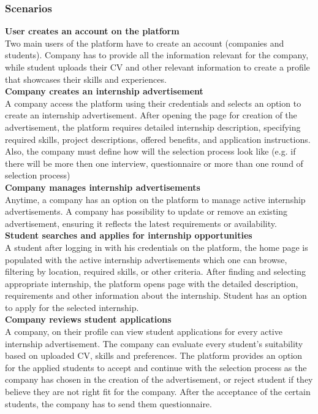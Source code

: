 \subsubsection{Scenarios}

\textbf{User creates an account on the platform}\\ 
Two main users of the platform have to create an account (companies and students). Company has to provide all the information relevant for the company, while student uploads their CV and other relevant information to create a profile that showcases their skills and experiences.\\

\textbf{Company creates an internship advertisement}\\
A company access the platform using their credentials and selects an option to create an internship advertisement. After opening the page for creation of the advertisement, the platform requires detailed internship description, specifying required skills, project descriptions, offered benefits, and application instructions. Also, the company must define how will the selection process look like (e.g. if there will be more then one interview, questionnaire or more than one round of selection process)  \\

\textbf{Company manages internship advertisements}\\
Anytime, a company has an option on the platform to manage active internship advertisements. A company has possibility to update or remove an existing advertisement, ensuring it reflects the latest requirements or availability.\\

\textbf{Student searches and applies for internship opportunities }\\
A student after logging in with his credentials on the platform, the home page is populated with the active internship advertisements which one can browse, filtering by location, required skills, or other criteria. After finding and selecting appropriate internship, the platform opens page with the detailed description, requirements and other information about the internship. Student has an option to apply for the selected internship.\\

\textbf{Company reviews student applications}\\
A company, on their profile can view student applications for every active internship advertisement. The company can evaluate every student's suitability based on uploaded CV, skills and preferences. The platform provides an option for the applied students to accept and continue with the selection process as the company has chosen in the creation of the advertisement, or reject student if they believe they are not right fit for the company. After the acceptance of the certain students, the company has to send them questionnaire. \\

